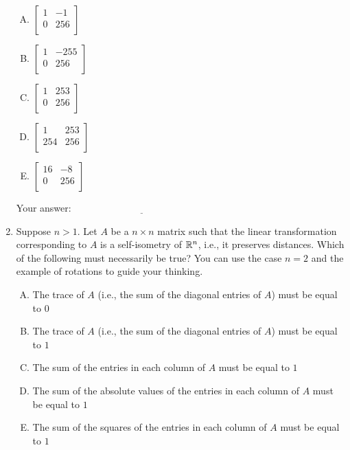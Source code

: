 \documentclass[10pt]{amsart}
\begin{document}
\begin{enumerate}
  \begin{enumerate}[(A)]
  \item $\left[ \begin{matrix} 1 & -1 \\ 0 & 256 \\\end{matrix}\right]$
  \item $\left[ \begin{matrix} 1 & -255 \\ 0 & 256 \\\end{matrix}\right]$
  \item $\left[ \begin{matrix} 1 & 253 \\ 0 & 256 \\\end{matrix}\right]$
  \item $\left[ \begin{matrix} 1 & 253 \\ 254 & 256 \\\end{matrix}\right]$
  \item $\left[ \begin{matrix} 16 & -8 \\ 0 & 256 \\\end{matrix}\right]$
  \end{enumerate}

  \vspace{0.1in}
  Your answer: $\underline{\qquad\qquad\qquad\qquad\qquad\qquad\qquad}$
  \vspace{0.1in}

\item Suppose $n > 1$. Let $A$ be a $n \times n$ matrix such that the
  linear transformation corresponding to $A$ is a self-isometry of
  $\mathbb{R}^n$, i.e., it preserves distances. Which of the following must
  necessarily be true? You can use the case $n = 2$ and the example of
  rotations to guide your thinking.

  \begin{enumerate}[(A)]
  \item The trace of $A$ (i.e., the sum of the diagonal entries of
    $A$) must be equal to $0$
  \item The trace of $A$ (i.e., the sum of the diagonal entries of
    $A$) must be equal to $1$
  \item The sum of the entries in each column of $A$ must be equal to
    $1$
  \item The sum of the absolute values of the entries in each column
    of $A$ must be equal to $1$
  \item The sum of the squares of the entries in each column of $A$
    must be equal to $1$
  \end{enumerate}


\end{enumerate}
\end{document}
